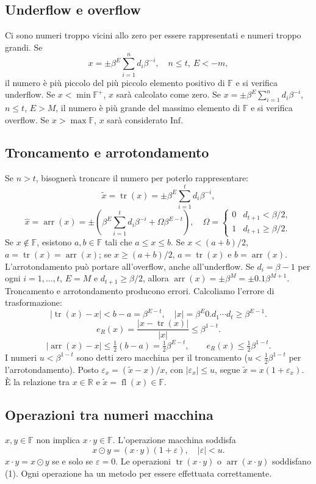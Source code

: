 \documentclass[11pt,a4paper]{article}
\newcommand{\R}{\mathbb R}\newcommand{\F}{\mathbb F}\newcommand{\tr}{\operatorname{tr}}\newcommand{\ar}{\operatorname{arr}}\newcommand{\fl}{\operatorname{fl}}
\newcommand{\pagina}[1]{\clearpage}
\begin{document}
\subsection*{Underflow e overflow}
Ci sono numeri troppo vicini allo zero per essere rappresentati e numeri troppo grandi. Se
\[x=\pm\beta^E\sum_{i=1}^{n}d_i\beta^{-i},\quad n\le t,\ E<-m,\]
il numero è più piccolo del più piccolo elemento positivo di $\F$ e si verifica underflow.
\pagina{4}
Se $x<\min\F^+$, $x$ sarà calcolato come zero. Se $x=\pm\beta^E\sum_{i=1}^n d_i\beta^{-i}$, $n\le t$, $E>M$, il numero è più grande del massimo elemento di $\F$ e si verifica overflow. Se $x>\max\F$, $x$ sarà considerato $\mathrm{Inf}$.
\subsection*{Troncamento e arrotondamento}
Se $n>t$, bisognerà troncare il numero per poterlo rappresentare:
\[\widetilde x=\tr(x)=\pm\beta^E\sum_{i=1}^t d_i\beta^{-i},\]
\[\widehat x=\ar(x)=\pm\left(\beta^E\sum_{i=1}^t d_i\beta^{-i}+\Omega\beta^{E-t}\right),\quad\Omega=\begin{cases}0&d_{t+1}<\beta/2,\\1&d_{t+1}\ge\beta/2.\end{cases}\]
Se $x\notin\F$, esistono $a,b\in\F$ tali che $a\le x\le b$. Se $x<(a+b)/2$, $a=\tr(x)=\ar(x)$; se $x\ge(a+b)/2$, $a=\tr(x)$ e $b=\ar(x)$.
L'arrotondamento può portare all'overflow, anche all'underflow. Se $d_i=\beta-1$ per ogni $i=1,\ldots,t$, $E=M$ e $d_{t+1}\ge\beta/2$, allora $\ar(x)=\pm\beta^M=\pm0.1\beta^{M+1}$. Troncamento e arrotondamento producono errori.
\pagina{5}
Calcoliamo l'errore di trasformazione:
\[|\tr(x)-x|<b-a=\beta^{E-t},\quad |x|=\beta^E0.d_1\cdots d_t\ge\beta^{E-1}.\]
\[e_R(x)=\frac{|x-\tr(x)|}{|x|}\le\beta^{1-t}.\]
\[|\ar(x)-x|\le\tfrac12(b-a)=\tfrac12\beta^{E-t},\qquad e_R(x)\le\tfrac12\beta^{1-t}.\]
I numeri $u<\beta^{1-t}$ sono detti zero macchina per il troncamento ($u<\frac12\beta^{1-t}$ per l'arrotondamento). Posto $\varepsilon_x=(\widetilde x-x)/x$, con $|\varepsilon_x|\le u$, segue $\widetilde x=x(1+\varepsilon_x)$. È la relazione tra $x\in\R$ e $\widetilde x=\fl(x)\in\F$.
\subsection*{Operazioni tra numeri macchina}
$x,y\in\F$ non implica $x\cdot y\in\F$. L'operazione macchina soddisfa
\[x\odot y=(x\cdot y)(1+\varepsilon),\quad |\varepsilon|<u.\tag{1}\]
$x\cdot y=x\odot y$ se e solo se $\varepsilon=0$. Le operazioni $\tr(x\cdot y)$ o $\ar(x\cdot y)$ soddisfano (1). Ogni operazione ha un metodo per essere effettuata correttamente.
\pagina{6}
\end{document}
